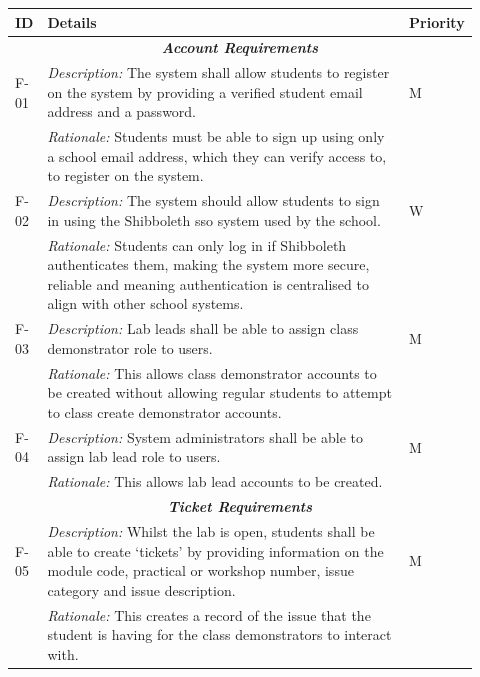 \begin{table}[H]
\small
\begin{tabular}{|p{0.05\linewidth} | p{0.78\linewidth} |p{0.09\linewidth}|}
 \hline
 \textbf{ID} & \textbf{Details} & \textbf{Priority} \\
 \hline
 
 \multicolumn{3}{c}{\textit{\textbf{Account Requirements}}}\\
 
 \hline
 F-01 & \textit{Description:} The system shall allow students to register on the system by providing a verified student email address and a password. & M\\
  \cline{2-2}
  & \textit{Rationale:} Students must be able to sign up using only a school email address, which they can verify access to, to register on the system. & \\

  
   \hline\hline
 F-02 & \textit{Description:} The system should allow students to sign in using the Shibboleth \gls{sso} system used by the school. & W\\
  \cline{2-2}
  & \textit{Rationale:} Students can only log in if Shibboleth authenticates them, making the system more secure, reliable and meaning authentication is centralised to align with other school systems. & \\

  
     \hline\hline
 F-03 & \textit{Description:} Lab leads shall be able to assign class demonstrator role to users. & M\\
  \cline{2-2}
  & \textit{Rationale:} This allows class demonstrator accounts to be created without allowing regular students to attempt to class create demonstrator accounts. & \\

  
       \hline\hline
 F-04 & \textit{Description:} System administrators shall be able to assign lab lead role to users. & M\\
  \cline{2-2}
  & \textit{Rationale:} This allows lab lead accounts to be created. & \\
  \hline
  
   \multicolumn{3}{c}{\textit{\textbf{Ticket Requirements}}}\\
  
 \hline
 F-05 & \textit{Description:} Whilst the lab is open, students shall be able to create `tickets' by providing information on the module code, practical or workshop number, issue category and issue description. & M\\
  \cline{2-2}
  & \textit{Rationale:} This creates a record of the issue that the student is having for the class demonstrators to interact with. & \\


\end{tabular}
\end{table}
